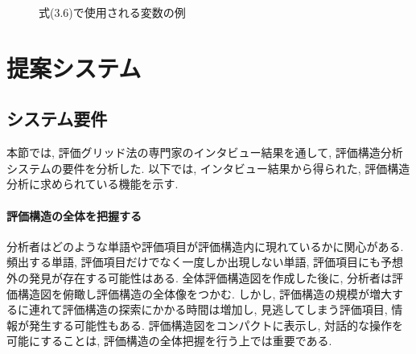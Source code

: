 \documentclass[syuuron]{kuee}
\begin{document}
		\begin{figure}
			\begin{center}
			\end{center}
			\caption{式(3.6)で使用される変数の例}
	  		\label{fig:met3}
		\end{figure}

\chapter{提案システム}
	\section{システム要件}
		本節では, 評価グリッド法の専門家のインタビュー結果\cite{hak1}を通して, 評価構造分析システムの要件を分析した. 
		以下では, インタビュー結果から得られた, 評価構造分析に求められている機能を示す. 
		\subsubsection{評価構造の全体を把握する}
			分析者はどのような単語や評価項目が評価構造内に現れているかに関心がある. 
			頻出する単語, 評価項目だけでなく一度しか出現しない単語, 評価項目にも予想外の発見が存在する可能性はある. 
			全体評価構造図を作成した後に, 分析者は評価構造図を俯瞰し評価構造の全体像をつかむ. 
			しかし, 評価構造の規模が増大するに連れて評価構造の探索にかかる時間は増加し, 
			見逃してしまう評価項目, 情報が発生する可能性もある. 
			評価構造図をコンパクトに表示し, 対話的な操作を可能にすることは, 
			評価構造の全体把握を行う上では重要である. 
\end{document}

